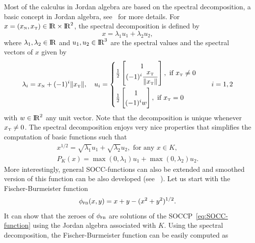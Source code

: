 {Most of the calculus in Jordan algebra are based on the spectral decomposition, a basic concept in Jordan algebra, see~\cite{Fukushima.ea2001} for more details.
For $x = (x_{\hbox{\tiny{N}}}, x_{\hbox{\tiny{T}}})\in \mathrm{I\!R}\times \mathrm{I\!R}^2$, the spectral decomposition is defined by
\begin{equation}
  \label{eq:Jordan-spectraldecomposition}
  x = \lambda_1 u_1 + \lambda_2 u_2,
\end{equation}
where $\lambda_1,\lambda_2\in \mathrm{I\!R}$ and $u_1,u_2\in\mathrm{I\!R}^3$ are the spectral values and the spectral vectors of $x$ given by
\begin{equation}
  \label{eq:Jordan-spectraldecomposition1}
    \lambda_i= x_\n + (-1)^i \|x_\t\|, \quad
    u_i =
    \begin{cases}
      \frac{1}{2}
      \begin{bmatrix}
        1 \\
        (-1)^i \Frac{x_\t}{\|x_\t\|}
      \end{bmatrix}, \text{ if } x_\t\neq 0 \\[5mm]
       \frac{1}{2}
      \begin{bmatrix}
        1 \\
        (-1)^i w
      \end{bmatrix}, \text{ if } x_\t = 0 \\
    \end{cases} \quad i = 1,2
\end{equation}
with $w\in\mathrm{I\!R}^2$ {any unit vector}. Note that the decomposition is unique {whenever $x_{\hbox{\tiny{T}}}\neq 0$}. The spectral decomposition enjoys very nice properties that {simplifies} the computation of basic functions such that
\begin{equation}
  \label{eq:Jordan-spectraldecomposition2}
  \begin{array}{l}
    x^{1/2} = \sqrt{\lambda_1} u_1 + \sqrt{\lambda_2} u_2, \text{ for any }  x \in K, \\[1mm]
    P_K(x) = \max(0,\lambda_1) u_1 + \max(0,\lambda_2) u_2. 
  \end{array}
\end{equation}
More interestingly,  general SOCC-functions can also be extended and smoothed version of this function can be also developed (see~\cite{Fukushima.ea2001}
). Let us start with the Fischer-Burmeister function
\begin{equation}
  \label{eq:Jordan-FB}
  \phi_{\fb}(x,y) = x+y - (x^2 + y^2 )^{1/2}.
\end{equation}
It can show that the zeroes of $\phi_{{\hbox{\tiny{\textsf FB}}}}$ are solutions of the SOCCP~\eqref{eq:SOCC-function} using the Jordan algebra associated with $K$. Using the spectral decomposition, the Fischer-Burmeister function can be easily computed as
}
